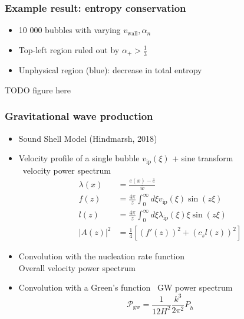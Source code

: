 \begin{frame}
    \frametitle{Example result: entropy conservation}
    \begin{minipage}[t]{0.48\linewidth}
        \begin{itemize}
            \item 10 000 bubbles with varying $v_\text{wall}, \alpha_n$
            \item Top-left region ruled out by $\alpha_+ > \frac{1}{3}$
            \item Unphysical region (blue): decrease in total entropy
        \end{itemize}%
    \end{minipage}%
    \hfill%
    \begin{minipage}[t]{0.48\linewidth}%
        TODO figure here
    \end{minipage}
\end{frame}

\begin{frame}
    \frametitle{Gravitational wave production}
    \begin{itemize}
        \footnotesize
        \item Sound Shell Model (Hindmarsh, 2018)
        \item Velocity profile of a single bubble $v_\text{ip}(\xi)$ + sine transform \\ \textrightarrow \ velocity power spectrum
        \begin{align}
            \lambda(x) &= \frac{e(x) - \bar{e}}{\bar{w}} \\
            f(z) &= \frac{4 \pi}{z} \int_0^\infty d\xi v_\text{ip}(\xi) \sin(z\xi) \\
            l(z) &= \frac{4 \pi}{z} \int_0^\infty d\xi \lambda_\text{ip}(\xi) \xi \sin(z\xi) \\
            |A(z)|^2 &= \frac{1}{4} \left[ (f'(z))^2 + (c_s l(z))^2 \right]
        \end{align}
        \item Convolution with the nucleation rate function \\
            \textrightarrow Overall velocity power spectrum
        \item Convolution with a Green's function \textrightarrow \ GW power spectrum
        \begin{equation}
            \mathcal{P}_\text{gw} = \frac{1}{12 H^2} \frac{k^3}{2\pi^2} P_{\dot{h}}
        \end{equation}
    \end{itemize}
\end{frame}

